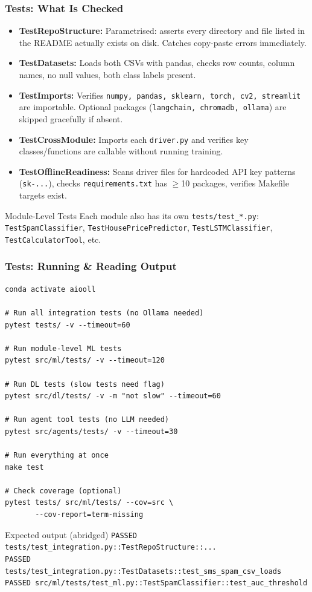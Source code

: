 \begin{frame}[fragile]\frametitle{Tests: What Is Checked}
\begin{itemize}
  \item \textbf{TestRepoStructure:} Parametrised: asserts every directory and file listed in the README actually exists on disk. Catches copy-paste errors immediately.
  \item \textbf{TestDatasets:} Loads both CSVs with pandas, checks row counts, column names, no null values, both class labels present.
  \item \textbf{TestImports:} Verifies \texttt{numpy, pandas, sklearn, torch, cv2, streamlit} are importable. Optional packages (\texttt{langchain, chromadb, ollama}) are skipped gracefully if absent.
  \item \textbf{TestCrossModule:} Imports each \texttt{driver.py} and verifies key classes/functions are callable without running training.
  \item \textbf{TestOfflineReadiness:} Scans driver files for hardcoded API key patterns (\texttt{sk-...}), checks \texttt{requirements.txt} has $\geq$10 packages, verifies Makefile targets exist.
\end{itemize}
\begin{block}{Module-Level Tests}
Each module also has its own \texttt{tests/test\_*.py}: \texttt{TestSpamClassifier}, \texttt{TestHousePricePredictor}, \texttt{TestLSTMClassifier}, \texttt{TestCalculatorTool}, etc.
\end{block}
\end{frame}

\begin{frame}[fragile]\frametitle{Tests: Running \& Reading Output}
\begin{lstlisting}
conda activate aiooll

# Run all integration tests (no Ollama needed)
pytest tests/ -v --timeout=60

# Run module-level ML tests
pytest src/ml/tests/ -v --timeout=120

# Run DL tests (slow tests need flag)
pytest src/dl/tests/ -v -m "not slow" --timeout=60

# Run agent tool tests (no LLM needed)
pytest src/agents/tests/ -v --timeout=30

# Run everything at once
make test

# Check coverage (optional)
pytest tests/ src/ml/tests/ --cov=src \
       --cov-report=term-missing
\end{lstlisting}
\begin{block}{Expected output (abridged)}
\texttt{PASSED tests/test\_integration.py::TestRepoStructure::...}\\
\texttt{PASSED tests/test\_integration.py::TestDatasets::test\_sms\_spam\_csv\_loads}\\
\texttt{PASSED src/ml/tests/test\_ml.py::TestSpamClassifier::test\_auc\_threshold}
\end{block}
\end{frame}

